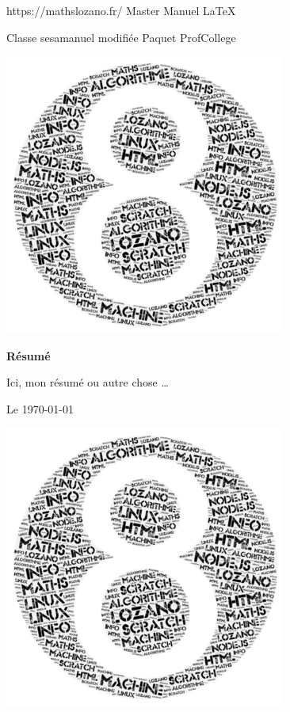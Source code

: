 \pagestyle{backCover}
\parindent=0pt
https://mathslozano.fr/  Master Manuel \LaTeX 

Classe sesamanuel modifiée Paquet ProfCollege
\begin{center}
    \includegraphics[scale=0.5]{images/8.png}%
\end{center}
\hrulefill
\begin{center}\bfseries\Huge
    Résumé
\end{center}
Ici, mon résumé ou autre chose \ldots

\hrulefill
\vspace*{1cm}
\begin{center}\bfseries\Large
    \myAuthorName
\end{center}
    
\begin{flushright}
       Le \today 
\end{flushright}   
\begin{center}
    \includegraphics[scale=0.5]{images/8.png}%
\end{center}
